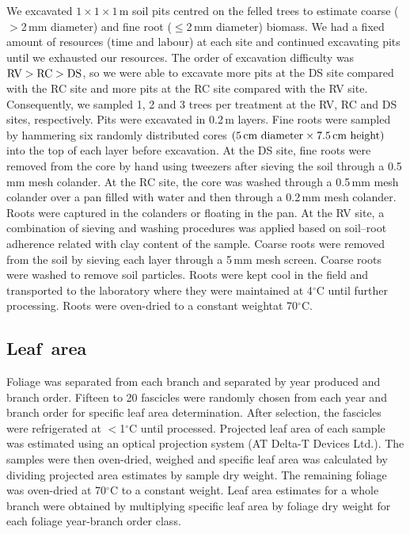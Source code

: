 \documentclass[final]{foresj}
\begin{document}
We excavated $1\times 1\times 1$\,m soil pits centred on
the felled trees to estimate coarse ($>$2\,mm diameter) and
fine root ($\le $2\,mm diameter) biomass. We had a fixed
amount of resources (time and labour) at each site and
continued excavating pits until we exhausted our resources.
The order of excavation difficulty was $\hbox{RV} >
\hbox{RC}> \hbox{DS}$, so we were able to excavate more
pits at the DS site compared with the RC site and more pits
at the RC site compared with the RV site. Consequently, we
sampled 1, 2 and 3 trees per treatment at the RV, RC and DS
sites, respectively. Pits were excavated in 0.2\,m layers.
Fine roots were sampled by hammering six randomly
distributed cores $(5\,\hbox{cm diameter} \times
7.5\,\hbox{cm height})$ into the top of each layer before
excavation. At the DS site, fine roots were removed from
the core by hand using tweezers after sieving the soil
through a 0.5\,mm mesh colander. At the RC site, the core
was washed through a 0.5\,mm mesh colander over a pan
filled with water and then through a 0.2\,mm mesh colander.
Roots were captured in the colanders or floating in the
pan. At the RV site, a combination of sieving and washing
procedures was applied based on soil--root adherence
related with clay content of the sample. Coarse roots were
removed from the soil by sieving each layer through a 5\,mm
mesh screen. Coarse roots were washed to remove soil
particles. Roots were kept cool in the field and
transported to the laboratory where they were maintained at
4$^{\circ}$C\vadjust{\pagebreak} until further processing. Roots were
oven-dried to a constant weight\break at 70$^{\circ}$C.


\subsection{Leaf~area}

Foliage was separated from each branch and separated by
year produced and branch order. Fifteen to 20 fascicles
were randomly chosen from each year and branch order for
specific leaf area determination. After selection, the
fascicles were refrigerated at $<$1$^{\circ}$C until
processed. Projected leaf area of each sample was estimated
using an optical projection system (AT Delta-T Devices
Ltd.). The samples were then oven-dried, weighed and
specific leaf area was calculated by dividing projected
area estimates by sample dry weight. The remaining foliage
was oven-dried at 70$^{\circ}$C to a constant weight. Leaf
area estimates for a whole branch were obtained by
multiplying specific leaf area by foliage dry weight for
each foliage year-branch order class.
\end{document}
